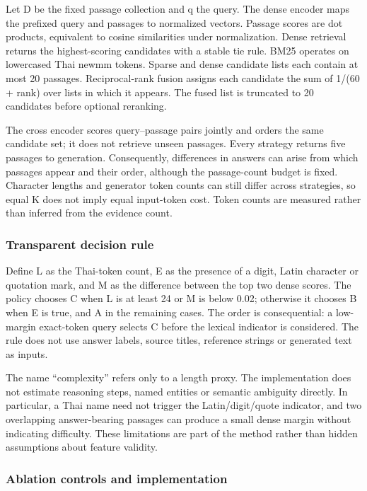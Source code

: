 Let D be the fixed passage collection and q the query. The dense encoder
maps the prefixed query and passages to normalized vectors. Passage
scores are dot products, equivalent to cosine similarities under
normalization. Dense retrieval returns the highest-scoring candidates
with a stable tie rule. BM25 operates on lowercased Thai newmm tokens.
Sparse and dense candidate lists each contain at most 20 passages.
Reciprocal-rank fusion assigns each candidate the sum of 1/(60 + rank)
over lists in which it appears. The fused list is truncated to 20
candidates before optional reranking.

The cross encoder scores query--passage pairs jointly and orders the
same candidate set; it does not retrieve unseen passages. Every strategy
returns five passages to generation. Consequently, differences in
answers can arise from which passages appear and their order, although
the passage-count budget is fixed. Character lengths and generator token
counts can still differ across strategies, so equal K does not imply
equal input-token cost. Token counts are measured rather than inferred
from the evidence count.

\hypertarget{transparent-decision-rule}{%
\subsubsection{Transparent decision
rule}\label{transparent-decision-rule}}

Define L as the Thai-token count, E as the presence of a digit, Latin
character or quotation mark, and M as the difference between the top two
dense scores. The policy chooses C when L is at least 24 or M is below
0.02; otherwise it chooses B when E is true, and A in the remaining
cases. The order is consequential: a low-margin exact-token query
selects C before the lexical indicator is considered. The rule does not
use answer labels, source titles, reference strings or generated text as
inputs.

The name ``complexity'' refers only to a length proxy. The
implementation does not estimate reasoning steps, named entities or
semantic ambiguity directly. In particular, a Thai name need not trigger
the Latin/digit/quote indicator, and two overlapping answer-bearing
passages can produce a small dense margin without indicating difficulty.
These limitations are part of the method rather than hidden assumptions
about feature validity.

\hypertarget{ablation-controls-and-implementation}{%
\subsubsection{Ablation controls and
implementation}\label{ablation-controls-and-implementation}}

